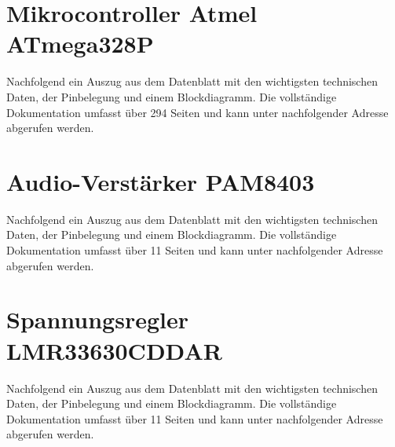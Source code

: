 \section{Mikrocontroller Atmel ATmega328P}
Nachfolgend ein Auszug aus dem Datenblatt mit den wichtigsten technischen Daten, der Pinbelegung und einem Blockdiagramm. Die vollständige Dokumentation umfasst über 294 Seiten und kann unter nachfolgender Adresse abgerufen werden.\par
{}
\section{Audio-Verstärker PAM8403}
Nachfolgend ein Auszug aus dem Datenblatt mit den wichtigsten technischen Daten, der Pinbelegung und einem Blockdiagramm. Die vollständige Dokumentation umfasst über 11 Seiten und kann unter nachfolgender Adresse abgerufen werden.\par
{}

\section{Spannungsregler LMR33630CDDAR}
Nachfolgend ein Auszug aus dem Datenblatt mit den wichtigsten technischen Daten, der Pinbelegung und einem Blockdiagramm. Die vollständige Dokumentation umfasst über 11 Seiten und kann unter nachfolgender Adresse abgerufen werden.\par
{}

